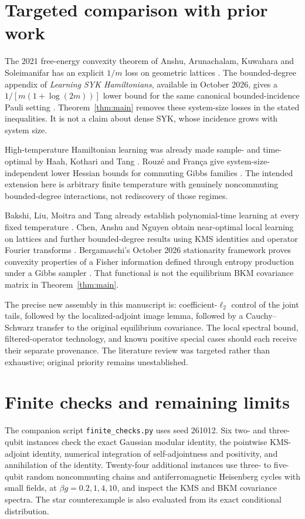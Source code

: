 \documentclass[11pt]{article}
\theoremstyle{remark}\newtheorem{remark}[theorem]{Remark}
\begin{document}
\section{Targeted comparison with prior work}
The 2021 free-energy convexity theorem of Anshu, Arunachalam, Kuwahara and Soleimanifar has an explicit $1/m$ loss on geometric lattices \cite[Theorem 6 and its formal counterpart]{AAKS}. The bounded-degree appendix of \emph{Learning SYK Hamiltonians}, available in October 2026, gives a $1/[m(1+\log(2m))]$ lower bound for the same canonical bounded-incidence Pauli setting \cite[Theorem D.1]{SYK}. Theorem~\ref{thm:main} removes these system-size losses in the stated inequalities. It is not a claim about dense SYK, whose incidence grows with system size.

High-temperature Hamiltonian learning was already made sample- and time-optimal by Haah, Kothari and Tang \cite{HKT}. Rouz\'e and Fran\c ca give system-size-independent lower Hessian bounds for commuting Gibbs families \cite[Appendix F.2]{RF}. The intended extension here is arbitrary finite temperature with genuinely noncommuting bounded-degree interactions, not rediscovery of those regimes.

Bakshi, Liu, Moitra and Tang already establish polynomial-time learning at every fixed temperature \cite{BLMT}. Chen, Anshu and Nguyen obtain near-optimal local learning on lattices and further bounded-degree results using KMS identities and operator Fourier transforms \cite{CAN}. Bergamaschi's October 2026 stationarity framework proves convexity properties of a Fisher information defined through entropy production under a Gibbs sampler \cite[Remark 1.3, Lemmas 3.3--3.4]{Berg}. That functional is not the equilibrium BKM covariance matrix in Theorem~\ref{thm:main}.

The precise new assembly in this manuscript is: coefficient-$\ell_2$ control of the joint tails, followed by the localized-adjoint image lemma, followed by a Cauchy--Schwarz transfer to the original equilibrium covariance. The local spectral bound, filtered-operator technology, and known positive special cases should each receive their separate provenance. The literature review was targeted rather than exhaustive; original priority remains unestablished.

\section{Finite checks and remaining limits}
The companion script \texttt{finite\_checks.py} uses seed 261012. Six two- and three-qubit instances check the exact Gaussian modular identity, the pointwise KMS-adjoint identity, numerical integration of self-adjointness and positivity, and annihilation of the identity. Twenty-four additional instances use three- to five-qubit random noncommuting chains and antiferromagnetic Heisenberg cycles with small fields, at $\beta g=0.2,1,4,10$, and inspect the KMS and BKM covariance spectra. The star counterexample is also evaluated from its exact conditional distribution.
\end{document}
